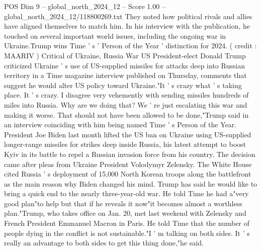 \begin{textsample}{POS Dim 9 – global\_north\_2024\_12 – Score 1.00 – global\_north\_2024\_12/118800269.txt}
They noted how political rivals and allies have aligned themselves to match him.
In his interview with the publication, he touched on several important world issues, including the ongoing war in Ukraine.Trump wins Time ' s ' Person of the Year ' distinction for 2024. ( credit : MAARIV ) Critical of Ukraine, Russia War US President-elect Donald Trump criticized Ukraine ' s use of US-supplied missiles for attacks deep into Russian territory in a Time magazine interview published on Thursday, comments that suggest he would alter US policy toward Ukraine."It ' s crazy what ' s taking place.
It ' s crazy.
I disagree very vehemently with sending missiles hundreds of miles into Russia.
Why are we doing that?
We ' re just escalating this war and making it worse.
That should not have been allowed to be done,"Trump said in an interview coinciding with him being named Time ' s Person of the Year.
President Joe Biden last month lifted the US ban on Ukraine using US-supplied longer-range missiles for strikes deep inside Russia, his latest attempt to boost Kyiv in its battle to repel a Russian invasion force from his country.
The decision came after pleas from Ukraine President Volodymyr Zelensky.
The White House cited Russia ' s deployment of 15,000 North Korean troops along the battlefront as the main reason why Biden changed his mind.
Trump has said he would like to bring a quick end to the nearly three-year-old war.
He told Time he had a"very good plan"to help but that if he reveals it now"it becomes almost a worthless plan."Trump, who takes office on Jan. 20, met last weekend with Zelensky and French President Emmanuel Macron in Paris.
He told Time that the number of people dying in the conflict is not sustainable."I ' m talking on both sides.
It ' s really an advantage to both sides to get this thing done,"he said.

\end{textsample}
